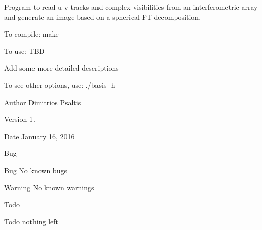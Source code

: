 Program to read u-\/v tracks and complex visibilities from an interferometric array and generate an image based on a spherical FT decomposition.

To compile\+: make

To use\+: T\+BD

Add some more detailed descriptions

To see other options, use\+: ./basis -\/h

\begin{DoxyAuthor}{Author}
Dimitrios Psaltis
\end{DoxyAuthor}
\begin{DoxyVersion}{Version}
1.
\end{DoxyVersion}
\begin{DoxyDate}{Date}
January 16, 2016
\end{DoxyDate}
\begin{DoxyRefDesc}{Bug}
\item[\hyperlink{bug__bug000021}{Bug}]No known bugs\end{DoxyRefDesc}


\begin{DoxyWarning}{Warning}
No known warnings
\end{DoxyWarning}
\begin{DoxyRefDesc}{Todo}
\item[\hyperlink{todo__todo000021}{Todo}]nothing left\end{DoxyRefDesc}
